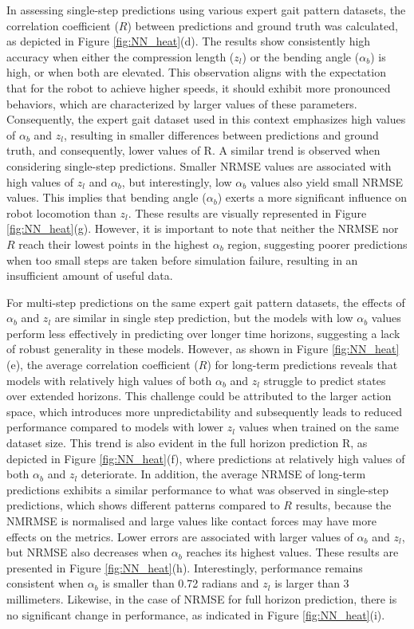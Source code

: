 In assessing single-step predictions using various expert gait pattern datasets, the correlation coefficient ($R$) between predictions and ground truth was calculated, as depicted in Figure \ref{fig:NN_heat}(d). The results show consistently high accuracy when either the compression length ($z_l$) or the bending angle ($\alpha_b$) is high, or when both are elevated. This observation aligns with the expectation that for the robot to achieve higher speeds, it should exhibit more pronounced behaviors, which are characterized by larger values of these parameters. Consequently, the expert gait dataset used in this context emphasizes high values of $\alpha_b$ and $z_l$, resulting in smaller differences between predictions and ground truth, and consequently, lower values of R. A similar trend is observed when considering single-step predictions. Smaller NRMSE values are associated with high values of $z_l$ and $\alpha_b$, but interestingly, low $\alpha_b$ values also yield small NRMSE values. This implies that bending angle ($\alpha_b$) exerts a more significant influence on robot locomotion than $z_l$. These results are visually represented in Figure \ref{fig:NN_heat}(g). However, it is important to note that neither the NRMSE nor $R$ reach their lowest points in the highest $\alpha_b$ region, suggesting poorer predictions when too small steps are taken before simulation failure, resulting in an insufficient amount of useful data.

For multi-step predictions on the same expert gait pattern datasets, the effects of $\alpha_b$ and $z_l$ are similar in single step prediction, but the models with low $\alpha_b$ values perform less effectively in predicting over longer time horizons, suggesting a lack of robust generality in these models. However, as shown in Figure \ref{fig:NN_heat}(e), the average correlation coefficient ($R$) for long-term predictions reveals that models with relatively high values of both $\alpha_b$ and $z_l$ struggle to predict states over extended horizons. This challenge could be attributed to the larger action space, which introduces more unpredictability and subsequently leads to reduced performance compared to models with lower $z_l$ values when trained on the same dataset size. This trend is also evident in the full horizon prediction R, as depicted in Figure \ref{fig:NN_heat}(f), where predictions at relatively high values of both $\alpha_b$ and $z_l$ deteriorate. In addition, the average NRMSE of long-term predictions exhibits a similar performance to what was observed in single-step predictions, which shows different patterns compared to $R$ results, because the NMRMSE is normalised and large values like contact forces may have more effects on the metrics. Lower errors are associated with larger values of $\alpha_b$ and $z_l$, but NRMSE also decreases when $\alpha_b$ reaches its highest values. These results are presented in Figure \ref{fig:NN_heat}(h). Interestingly, performance remains consistent when $\alpha_b$ is smaller than 0.72 radians and $z_l$ is larger than 3 millimeters. Likewise, in the case of NRMSE for full horizon prediction, there is no significant change in performance, as indicated in Figure \ref{fig:NN_heat}(i).

